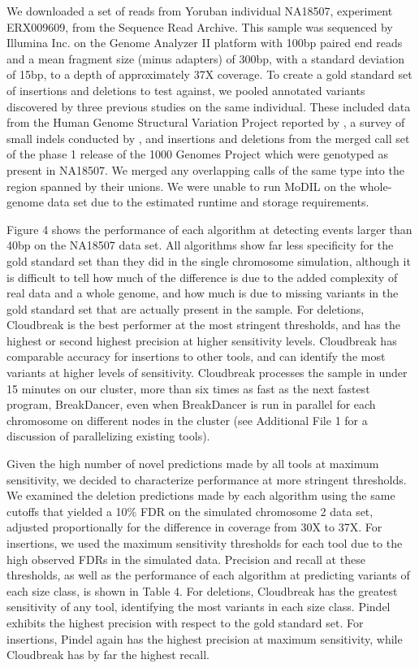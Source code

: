 \documentclass[10pt]{bmc_article}
\newenvironment{bmcformat}{\fussy\setboolean{publ}{true}}{\fussy}
\begin{document}
\begin{bmcformat}
We downloaded a set of reads from Yoruban individual NA18507, experiment ERX009609, from the Sequence Read Archive. This sample was sequenced by Illumina Inc. on the Genome Analyzer II platform with 100bp paired end reads and a mean fragment size (minus adapters) of 300bp, with a standard deviation of 15bp, to a depth of approximately 37X coverage. To create a gold standard set of insertions and deletions to test against, we pooled annotated variants discovered by three previous studies on the same individual. These included data from the Human Genome Structural Variation Project reported by \cite{Kidd:2008p926}, a survey of small indels conducted by \cite{Mills:2011fi}, and insertions and deletions from the merged call set of the phase 1 release of the 1000 Genomes Project \cite{GenomesProjectConsortium:2012co} which were genotyped as present in NA18507. We merged any overlapping calls of the same type into the region spanned by their unions. We were unable to run MoDIL on the whole-genome data set due to the estimated runtime and storage requirements.

Figure 4 shows the performance of each algorithm at detecting events larger than 40bp on the NA18507 data set. All algorithms show far less specificity for the gold standard set than they did in the single chromosome simulation, although it is difficult to tell how much of the difference is due to the added complexity of real data and a whole genome, and how much is due to missing variants in the gold standard set that are actually present in the sample. For deletions, Cloudbreak is the best performer at the most stringent thresholds, and has the highest or second highest precision at higher sensitivity levels. Cloudbreak has comparable accuracy for insertions to other tools, and can identify the most variants at higher levels of sensitivity. Cloudbreak processes the sample in under 15 minutes on our cluster, more than six times as fast as the next fastest program, BreakDancer, even when BreakDancer is run in parallel for each chromosome on different nodes in the cluster (see Additional File 1 for a discussion of parallelizing existing tools).

Given the high number of novel predictions made by all tools at maximum sensitivity, we decided to characterize performance at more stringent thresholds. We examined the deletion predictions made by each algorithm using the same cutoffs that yielded a 10\% FDR on the simulated chromosome 2 data set, adjusted proportionally for the difference in coverage from 30X to 37X. For insertions, we used the maximum sensitivity thresholds for each tool due to the high observed FDRs in the simulated data. Precision and recall at these thresholds, as well as the performance of each algorithm at predicting variants of each size class, is shown in Table 4. For deletions, Cloudbreak has the greatest sensitivity of any tool, identifying the most variants in each size class. Pindel exhibits the highest precision with respect to the gold standard set. For insertions, Pindel again has the highest precision at maximum sensitivity, while Cloudbreak has by far the highest recall.


\end{bmcformat}
\end{document}
